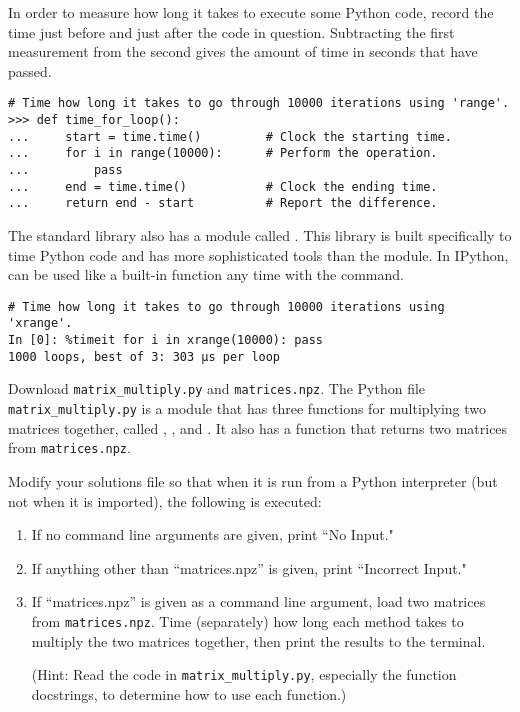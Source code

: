 In order to measure how long it takes to execute some Python code, record the time just before and just after the code in question.
Subtracting the first measurement from the second gives the amount of time in seconds that have passed.

\begin{lstlisting}
# Time how long it takes to go through 10000 iterations using 'range'.
>>> def time_for_loop():
...     start = time.time()         # Clock the starting time.
...     for i in range(10000):      # Perform the operation.
...         pass
...     end = time.time()           # Clock the ending time.
...     return end - start          # Report the difference.
\end{lstlisting}

The standard library also has a module called .
This library is built specifically to time Python code and has more sophisticated tools than the  module.
In IPython,  can be used like a built-in function any time with the  command.

\begin{lstlisting}
# Time how long it takes to go through 10000 iterations using 'xrange'.
In [0]: %timeit for i in xrange(10000): pass 
1000 loops, best of 3: 303 µs per loop
\end{lstlisting}

\begin{problem}
Download \texttt{matrix\_multiply.py} and \texttt{matrices.npz}.
The Python file \texttt{matrix\_multiply.py} is a module that has three functions for multiplying two matrices together, called , , and .
It also has a  function that returns two matrices from \texttt{matrices.npz}.

Modify your solutions file so that when it is run from a Python interpreter (but not when it is imported), the following is executed:
\begin{enumerate}
\item If no command line arguments are given, print ``No Input."
\item If anything other than ``matrices.npz'' is given, print ``Incorrect Input."
\item If ``matrices.npz'' is given as a command line argument, load two matrices from \texttt{matrices.npz}. Time (separately) how long each method takes to multiply the two matrices together, then print the results to the terminal.

(Hint: Read the code in \texttt{matrix\_multiply.py}, especially the function docstrings, to determine how to use each function.)
\end{enumerate}
\end{problem}

